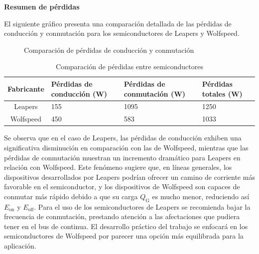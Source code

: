 \textbf{Resumen de pérdidas}

El siguiente gráfico presenta una comparación detallada de las pérdidas de conducción y conmutación para los semiconductores de Leapers y Wolfspeed.

\begin{figure}[H]
	\centering
	\caption{Comparación de pérdidas de conducción y conmutación}
	\label{fig:loss_comparison}
\end{figure}

\begin{table}[H]
	\centering
	\begin{tabular}{|c|p{3.5cm}|p{3.5cm}|p{3.5cm}|}
		\hline
		\textbf{Fabricante} & \textbf{Pérdidas de conducción (W)} & \textbf{Pérdidas de conmutación (W)} & \textbf{Pérdidas totales (W)} \\
		\hline
		Leapers & 155 & 1095 & 1250 \\
		\hline
		Wolfspeed & 450 & 583 & 1033 \\
		\hline
	\end{tabular}
	\caption{Comparación de pérdidas entre semiconductores}
\end{table}

Se observa que en el caso de Leapers, las pérdidas de conducción exhiben una significativa disminución en comparación con las de Wolfspeed, mientras que las pérdidas de conmutación muestran un incremento dramático para Leapers en relación con Wolfspeed. Este fenómeno sugiere que, en líneas generales, los dispositivos desarrollados por Leapers podrían ofrecer un camino de corriente más favorable en el semiconductor, y los dispositivos de Wolfspeed son capaces de conmutar más rápido debido a que su carga $Q_{\text{G}}$ es mucho menor, reduciendo así $E_{\text{on}}$ y $E_{\text{off}}$. Para el uso de los semiconductores de Leapers se recomienda bajar la frecuencia de conmutación, prestando atención a las afectaciones que pudiera tener en el bus de continua. El desarrollo práctico del trabajo se enfocará en los semiconductores de Wolfspeed por parecer una opción más equilibrada para la aplicación.

